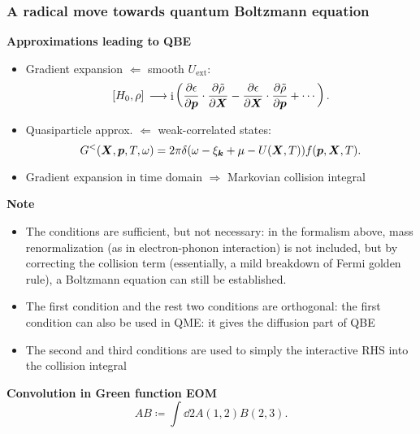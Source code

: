 \documentclass[t]{beamer}
\DeclareMathOperator{\ii}{i}
\begin{document}
\begin{frame}[allowframebreaks]
\frametitle{A radical move towards quantum Boltzmann equation}

\textbf{Approximations leading to QBE} \begin{itemize}
    \item Gradient expansion $\Leftarrow$ smooth $U_{\text{ext}}$:
    \begin{equation}
        \comm*{H_0}{\rho} \longrightarrow \ii \left(
            \pdv{\epsilon}{\vb*{p}} \cdot \pdv{\tilde{\rho}}{\vb*{X}}
            - \pdv{\epsilon}{\vb*{X}} \cdot \pdv{\tilde{\rho}}{\vb*{p}} + \cdots
        \right).
    \end{equation}
    \item Quasiparticle approx. $\Leftarrow$ weak-correlated states:
    \begin{equation}
       G^<(\vb*{X}, \vb*{p}, T, \omega) = 2 \pi \delta(\omega - \xi_{\vb*{k}} + \mu - U(\vb*{X}, T)) f(\vb*{p}, \vb*{X}, T).
    \end{equation}
    \item Gradient expansion in time domain $\Rightarrow$ Markovian collision integral
\end{itemize}    

\framebreak

\textbf{Note} \begin{itemize}
    \item The conditions are sufficient, but not necessary: 
        in the formalism above, mass renormalization
        (as in electron-phonon interaction) is not included, 
        but by correcting the collision term 
        (essentially, a mild breakdown of Fermi golden rule),
        a Boltzmann equation can still be established.
    \item The first condition and the rest two conditions are orthogonal:
        the first condition can also be used in QME: 
        it gives the diffusion part of QBE
    \item The second and third conditions are used to 
        simply the interactive RHS into 
        the collision integral
\end{itemize} 

\framebreak

\textbf{Convolution in Green function EOM} 
\begin{equation}
    AB \coloneqq \int \dd{2} A(1, 2) B(2, 3).
\end{equation}


\end{frame}
\end{document}
